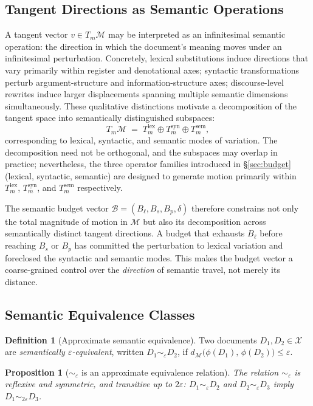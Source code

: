 \documentclass[12pt, a4paper]{article}
\theoremstyle{plain}
\newtheorem{proposition}[theorem]{Proposition}
\theoremstyle{definition}
\newtheorem{definition}[theorem]{Definition}
\theoremstyle{remark}
\newcommand{\calX}{\mathcal{X}}
\newcommand{\calM}{\mathcal{M}}
\newcommand{\ve}{\varepsilon}
\newcommand{\dM}{d_{\calM}}
\begin{document}
\subsection{Tangent Directions as Semantic Operations}

A tangent vector $v \in T_m\calM$ may be interpreted as an infinitesimal
semantic operation: the direction in which the document's meaning moves under
an infinitesimal perturbation.  Concretely, lexical substitutions induce
directions that vary primarily within register and denotational axes; syntactic
transformations perturb argument-structure and information-structure axes;
discourse-level rewrites induce larger displacements spanning multiple semantic
dimensions simultaneously.  These qualitative distinctions motivate a
decomposition of the tangent space into semantically distinguished subspaces:
\[
   T_m\calM
   \;=\;
   T_m^{\mathrm{lex}}
   \oplus
   T_m^{\mathrm{syn}}
   \oplus
   T_m^{\mathrm{sem}},
\]
corresponding to lexical, syntactic, and semantic modes of variation.  The
decomposition need not be orthogonal, and the subspaces may overlap in practice;
nevertheless, the three operator families introduced in \S\ref{sec:budget}
(lexical, syntactic, semantic) are designed to generate motion primarily within
$T_m^{\mathrm{lex}}$, $T_m^{\mathrm{syn}}$, and $T_m^{\mathrm{sem}}$
respectively.

The semantic budget vector $\mathcal{B} = (B_\ell, B_s, B_p, \delta)$
therefore constrains not only the total magnitude of motion in $\calM$ but also
its decomposition across semantically distinct tangent directions.  A budget
that exhausts $B_\ell$ before reaching $B_s$ or $B_p$ has committed the
perturbation to lexical variation and foreclosed the syntactic and semantic modes.
This makes the budget vector a coarse-grained control over the \emph{direction}
of semantic travel, not merely its distance.

\subsection{Semantic Equivalence Classes}

\begin{definition}[Approximate semantic equivalence]
\label{def:equiv}
Two documents $D_1, D_2 \in \calX$ are \emph{semantically $\ve$-equivalent},
written $D_1 \sim_\ve D_2$, if
$\dM\bigl(\phi(D_1),\, \phi(D_2)\bigr) \le \ve$.
\end{definition}

\begin{proposition}[$\sim_\ve$ is an approximate equivalence relation]
\label{prop:equiv}
The relation $\sim_\ve$ is reflexive and symmetric, and transitive up to $2\ve$:
$D_1 \sim_\ve D_2$ and $D_2 \sim_\ve D_3$ imply $D_1 \sim_{2\ve} D_3$.
\end{proposition}
\end{document}
